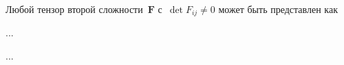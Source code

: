 \label{para:polardecomposition}

\begin{otherlanguage}{russian}

Любой тензор второй сложности~${\bm{F}}$ с~${\operatorname{det} F_{ij} \neq 0}$ может быть представлен как

...

\newpage ...



\end{otherlanguage}



\newpage



